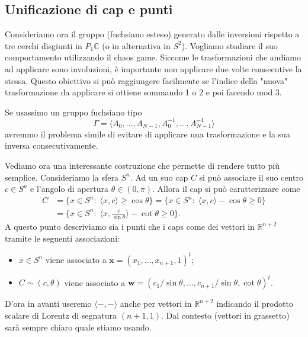 \subsection{Unificazione di cap e punti}

Consideriamo ora il gruppo (fuchsiano esteso) generato dalle inversioni rispetto a tre cerchi disgiunti in $P_1\mathbb C$ (o in alternativa in $S^{2}$).
Vogliamo studiare il suo comportamento utilizzando il chaos game. 
Siccome le trasformazioni che andiamo ad applicare sono involuzioni, è importante non applicare due volte consecutive la stessa. Questo obiettivo si può raggiungere facilmente se l'indice della "nuova" trasformazione da applicare si ottiene sommando 1 o 2 e poi facendo mod 3.

Se usassimo un gruppo fuchsiano tipo 
$$\Gamma = \langle A_0, \dots, A_{N-1}, A_0^{-1},\dots, A_{N-1}^{-1}\rangle$$
avremmo il problema simile di evitare di applicare una trasformazione e la sua inversa consecutivamente. 

Vediamo ora una interessante costruzione che permette di rendere tutto più semplice. 
Consideriamo la sfera $S^n$. Ad un suo cap $C$ si può associare il suo centro $c\in S^n$ e l'angolo di apertura $\theta\in(0,\pi)$.
Allora il cap si può caratterizzare come 
\begin{align*}
    C &= \{x\in S^n:\; \langle x, c\rangle \geq\cos\theta\} = 
    \{x\in S^n:\; \langle x, c\rangle -\cos\theta\geq 0\} \\&= 
    \{x\in S^n:\; \langle x, \frac{c}{\sin\theta}\rangle - \cot\theta\geq 0\}.
\end{align*}
A questo punto descriviamo sia i punti che i caps come dei vettori in $\mathbb R^{n+2}$ tramite le seguenti associazioni: 
\begin{itemize}
    \item $x\in S^n$ viene associato a $\mathbf{x} = (x_1,\dots,x_{n+1}, 1)^t$;
    \item $C\sim(c,\theta)$ viene associato a $\mathbf{w} = (c_1/\sin\theta,\dots,c_{n+1}/\sin\theta, \cot\theta)^t$.
\end{itemize}
D'ora in avanti useremo $\langle-,-\rangle$ anche per vettori in $\mathbb R^{n+2}$ indicando il prodotto scalare di Lorentz di segnatura $(n+1,1)$. Dal contesto (vettori in grassetto) sarà sempre chiaro quale stiamo usando. 


